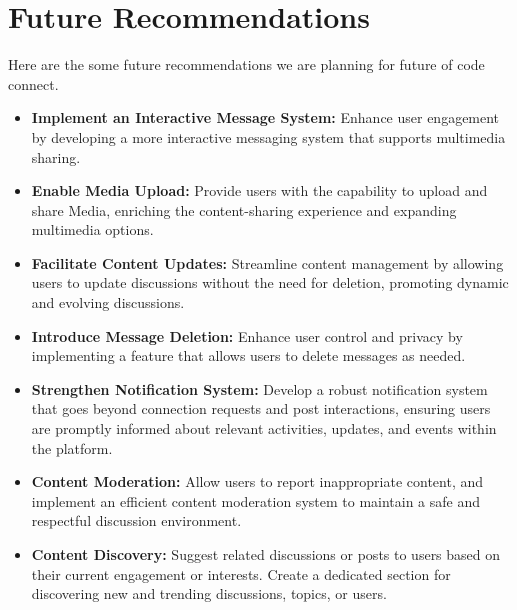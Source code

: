 \section{Future Recommendations}
Here are the some future recommendations we are planning for future of code connect.
\begin{itemize}
    \item \textbf{Implement an Interactive Message System:} Enhance user engagement by developing a more interactive messaging system that supports multimedia sharing.
    \item \textbf{Enable Media Upload:} Provide users with the capability to upload and share Media, enriching the content-sharing experience and expanding multimedia options.
    \item \textbf{Facilitate Content Updates:} Streamline content management by allowing users to update discussions without the need for deletion, promoting dynamic and evolving discussions.
    \item \textbf{Introduce Message Deletion:}  Enhance user control and privacy by implementing a feature that allows users to delete messages as needed.
    \item \textbf{Strengthen Notification System:} Develop a robust notification system that goes beyond connection requests and post interactions, ensuring users are promptly informed about relevant activities, updates, and events within the platform.
    \item \textbf{Content Moderation:}
     Allow users to report inappropriate content, and implement an efficient content moderation system to maintain a safe and respectful discussion environment.
    

    \item \textbf{Content Discovery:} Suggest related discussions or posts to users based on their current engagement or interests.
    Create a dedicated section for discovering new and trending discussions, topics, or users.
\end{itemize}

